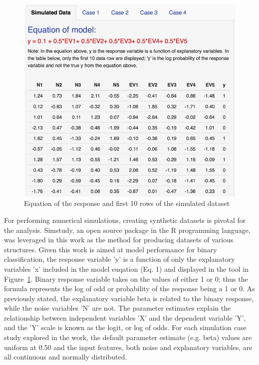 \documentclass{llncs}
\begin{document}
\begin{figure}
\centering
\includegraphics[scale=0.75]{dataset.png}
\caption{Equation of the response and first 10 rows of the simulated dataset}
\label{fig:dataset}
\end{figure}

For performing numerical simulations, creating synthetic datasets is pivotal for the analysis. Simstudy, an open source package in the R programming language, was leveraged in this work as the method for producing datasets of various structures. Given this work is aimed at model performance for binary classification, the response variable 'y' is a function of only the explanatory variables 'x' included in the model euqation (Eq. 1) and displayed in the tool in Figure~\ref{fig:dataset}. Binary response variable takes on the values of either 1 or 0; thus the formula represents the log of odd or probability of the response being a 1 or 0. As previously stated, the explanatory variable beta is related to the binary response, while the noise variables 'N' are not. The parameter estimates explain the relationship between independent variables 'X' and the dependent variable 'Y', and the 'Y' scale is known as the logit, or log of odds. For each simulation case study explored in the work, the default parameter estimate (e.g. beta) values are uniform at 0.50 and the input features, both noise and explanatory variables, are all continuous and normally distributed. 
\end{document}
